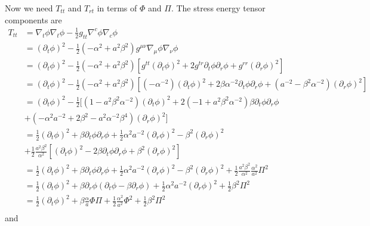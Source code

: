 \documentclass[12pt]{article}
\numberwithin{equation}{section}
\begin{document}
Now we need $T_{tt}$ and $T_{rt}$ in terms of $\Phi$ and $\Pi$.  The stress energy tensor components are
\begin{equation*}
\begin{aligned}
T_{tt} &= \nabla_t \phi \nabla_t \phi - \frac{1}{2} g_{tt} \nabla^c \phi \nabla_c \phi \\
&= (\partial_t \phi)^2 - \frac{1}{2} (-\alpha^2 + a^2 \beta^2) g^{\mu \nu} \nabla_{\mu} \phi \nabla_{\nu} \phi \\
&= (\partial_t \phi)^2 - \frac{1}{2} (-\alpha^2 + a^2 \beta^2) [g^{tt} (\partial_t \phi)^2 + 2 g^{tr} \partial_t \phi \partial_r \phi + g^{rr} (\partial_r \phi)^2] \\
&= (\partial_t \phi)^2 - \frac{1}{2} (-\alpha^2 + a^2 \beta^2) [(-\alpha^{-2}) (\partial_t \phi)^2 + 2 \beta \alpha^{-2} \partial_t \phi \partial_r \phi + (a^{-2} - \beta^2 \alpha^{-2}) (\partial_r \phi)^2] \\
&= (\partial_t \phi)^2 - \frac{1}{2} [(1 - a^2 \beta^2 \alpha^{-2}) (\partial_t \phi)^2 + 2 (-1 + a^2 \beta^2 \alpha^{-2}) \beta \partial_t \phi \partial_r \phi \\
&+ (-\alpha^2 a^{-2} + 2 \beta^2 - a^2 \alpha^{-2} \beta^4) (\partial_r \phi)^2] \\
&= \frac{1}{2} (\partial_t \phi)^2 + \beta \partial_t \phi \partial_r \phi + \frac{1}{2} \alpha^2 a^{-2} (\partial_r \phi)^2 - \beta^2 (\partial_r \phi)^2 \\
&+ \frac{1}{2} \frac{a^2 \beta^2}{\alpha^{2}} [(\partial_t \phi)^2 - 2 \beta \partial_t \phi \partial_r \phi + \beta^2 (\partial_r \phi)^2] \\
&= \frac{1}{2} (\partial_t \phi)^2 + \beta \partial_t \phi \partial_r \phi + \frac{1}{2} \alpha^2 a^{-2} (\partial_r \phi)^2 - \beta^2 (\partial_r \phi)^2 + \frac{1}{2} \frac{a^2 \beta^2}{\alpha^{2}} \frac{\alpha^2}{a^2} \Pi^2 \\
&= \frac{1}{2} (\partial_t \phi)^2 + \beta \partial_r \phi (\partial_t \phi - \beta \partial_r \phi) + \frac{1}{2} \alpha^2 a^{-2} (\partial_r \phi)^2 + \frac{1}{2} \beta^2 \Pi^2 \\
&= \frac{1}{2} (\partial_t \phi)^2 + \beta \frac{\alpha}{a} \Phi \Pi + \frac{1}{2} \frac{\alpha^2}{a^{2}} \Phi^2 + \frac{1}{2} \beta^2 \Pi^2 \\
\end{aligned}
\end{equation*}
and
\end{document}
